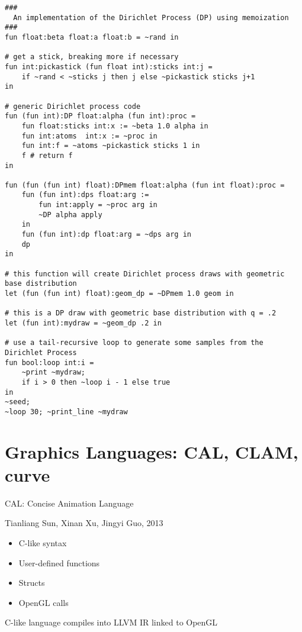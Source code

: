 \documentclass{plt}
\begin{document}
\begin{frame}[fragile]

\fontsize{6.5pt}{6.5pt}\selectfont

\begin{verbatim}
###
  An implementation of the Dirichlet Process (DP) using memoization
###
fun float:beta float:a float:b = ~rand in 

# get a stick, breaking more if necessary 
fun int:pickastick (fun float int):sticks int:j =
    if ~rand < ~sticks j then j else ~pickastick sticks j+1
in

# generic Dirichlet process code
fun (fun int):DP float:alpha (fun int):proc =
    fun float:sticks int:x := ~beta 1.0 alpha in
    fun int:atoms  int:x := ~proc in
    fun int:f = ~atoms ~pickastick sticks 1 in
    f # return f
in

fun (fun (fun int) float):DPmem float:alpha (fun int float):proc =
    fun (fun int):dps float:arg := 
        fun int:apply = ~proc arg in
        ~DP alpha apply 
    in
    fun (fun int):dp float:arg = ~dps arg in
    dp
in

# this function will create Dirichlet process draws with geometric base distribution
let (fun (fun int) float):geom_dp = ~DPmem 1.0 geom in
 
# this is a DP draw with geometric base distribution with q = .2
let (fun int):mydraw = ~geom_dp .2 in

# use a tail-recursive loop to generate some samples from the Dirichlet Process
fun bool:loop int:i =
    ~print ~mydraw;
    if i > 0 then ~loop i - 1 else true
in
~seed;
~loop 30; ~print_line ~mydraw
\end{verbatim}

\end{frame}

\section{Graphics Languages: CAL, CLAM, curve}

\begin{frame}{CAL: Concise Animation Language}

Tianliang Sun,
Xinan Xu,
Jingyi Guo, 2013

\begin{itemize}
\item C-like syntax
\item User-defined functions
\item Structs
\item OpenGL calls
\end{itemize}
 
C-like language compiles into LLVM IR linked to OpenGL

\end{frame}
\end{document}
